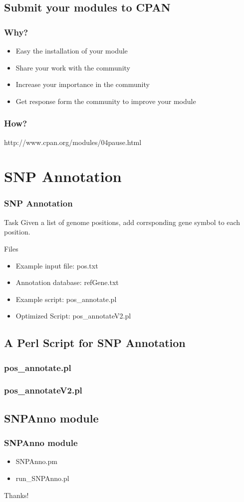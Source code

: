 \documentclass[UTF8]{beamer}
\begin{document}
\subsection{Submit your modules to CPAN}

\begin{frame}
  \frametitle{Why?}
  \begin{itemize}
    \item Easy the installation of your module
    \item Share your work with the community
    \item Increase your importance in the community
    \item Get response form the community to improve your module
  \end{itemize}
\end{frame}

\begin{frame}
  \frametitle{How?}
  http://www.cpan.org/modules/04pause.html
\end{frame}

\section{SNP Annotation}

\begin{frame}
  \frametitle{SNP Annotation}
  \begin{block}{Task}
    Given a list of genome positions, add corrsponding gene symbol to each
    position.
  \end{block}
  \begin{block}{Files}
    \begin{itemize}
      \item Example input file: pos.txt
      \item Annotation database: refGene.txt
      \item Example script: pos_annotate.pl
      \item Optimized Script: pos_annotateV2.pl
    \end{itemize}
  \end{block}
\end{frame}

\subsection{A Perl Script for SNP Annotation}
\begin{frame}
  \frametitle{pos_annotate.pl}
\end{frame}

\begin{frame}
  \frametitle{pos_annotateV2.pl}
\end{frame}

\subsection{SNPAnno module}

\begin{frame}
  \frametitle{SNPAnno module}
  \begin{itemize}
    \item SNPAnno.pm
    \item run_SNPAnno.pl
  \end{itemize}
\end{frame}


\begin{frame}
  \centerline{\huge{Thanks!}}
\end{frame}
\end{document}
